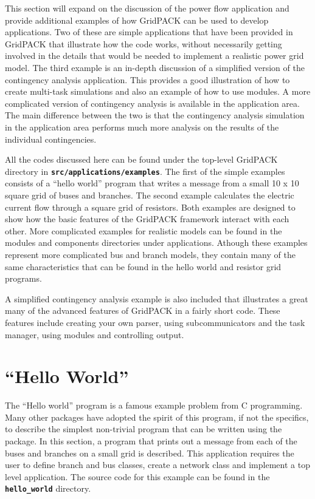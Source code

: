 \documentclass[12pt]{report} %
\begin{document}
This section will expand on the discussion of the power flow application and provide additional examples of how GridPACK can be used to develop applications. Two of these are simple applications that have been provided in GridPACK that illustrate how the code works, without necessarily getting involved in the details that would be needed to implement a realistic power grid model. The third example is an in-depth discussion of a simplified version of the contingency analysis application. This provides a good illustration of how to create multi-task simulations and also an example of how to use modules. A more complicated version of contingency analysis is available in the application area. The main difference between the two is that the contingency analysis simulation in the application area performs much more analysis on the results of the individual contingencies.

All the codes discussed here can be found under the top-level GridPACK directory in \texttt{\textbf{src/applications/examples}}.
The first of the simple examples consists of a ``hello world'' program that writes a message from a small 10 x 10 square grid of buses and branches. The second example calculates the electric current flow through a square grid of resistors. Both examples are designed to show how the basic features of the GridPACK framework interact with each other. More complicated examples for realistic models can be found in the modules and components directories under applications. Athough these examples represent more complicated bus and branch models, they contain many of the same characteristics that can be found in the hello world and resistor grid programs.

A simplified contingency analysis example is also included that illustrates a great many of the advanced features of GridPACK in a fairly short code. These features include creating your own parser, using subcommunicators and the task manager, using modules and controlling output.

\section{``Hello World''}

The ``Hello world'' program is a famous example problem from C programming. Many other packages have adopted the spirit of this program, if not the specifics, to describe the simplest non-trivial program that can be written using the package. In this section, a program that prints out a message from each of the buses and branches on a small grid is described. This application requires the user to define branch and bus classes, create a network class and implement a top level application. The source code for this example can be found in the \texttt{\textbf{hello\_world}} directory.
\end{document}

